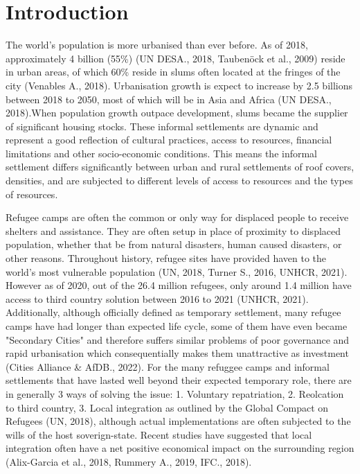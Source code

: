 \documentclass[11pt, a4paper, twoside]{report}
\begin{document}
\newpage

\chapter{Introduction}\label{Intro}

The world’s population is more urbanised than ever before. As of 2018, approximately 4 billion (55\%) (UN DESA., 2018, Taubenöck et al., 2009) reside in urban areas, of which 60\% reside in slums often located at the fringes of the city (Venables A., 2018). Urbanisation growth is expect to increase by 2.5 billions between 2018 to 2050, most of which will be in Asia and Africa (UN DESA., 2018).When population growth outpace development, slums became the supplier of significant housing stocks. These informal settlements are dynamic and represent a good reflection of cultural practices, access to resources, financial limitations and other socio-economic conditions. This means the informal settlement differs significantly between urban and rural settlements of roof covers, densities, and are subjected to different levels of access to resources and the types of resources.\\\par

Refugee camps are often the common or only way for displaced people to receive shelters and assistance. They are often setup in place of proximity to displaced population, whether that be from natural disasters, human caused disasters, or other reasons. Throughout history, refugee sites have provided haven to the world's most vulnerable population (UN, 2018, Turner S., 2016, UNHCR, 2021). However as of 2020, out of the 26.4 million refugees, only around 1.4 million have access to third country solution between 2016 to 2021 (UNHCR, 2021). Additionally, although officially defined as temporary settlement, many refugee camps have had longer than expected life cycle, some of them have even became "Secondary Cities" and therefore suffers similar problems of poor governance and rapid urbanisation which consequentially makes them unattractive as investment (Cities Alliance \& AfDB., 2022). For the many refuggee camps and informal settlements that have lasted well beyond their expected temporary role, there are in generally 3 ways of solving the issue: 1. Voluntary repatriation, 2. Reolcation to third country, 3. Local integration as outlined by the Global Compact on Refugees (UN, 2018), although actual implementations are often subjected to the wills of the host soverign-state. Recent studies have suggested that local integration often have a net positive economical impact on the surrounding region (Alix-Garcia et al., 2018, Rummery A., 2019, IFC., 2018). \\\par
\end{document}
